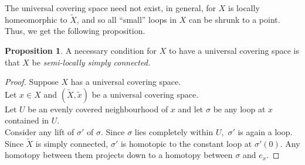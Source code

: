 \documentclass[12pt]{article}
\theoremstyle{definition}
\numberwithin{thm}{section}
\newtheorem{prop}[thm]{Proposition}
\begin{document}
The universal covering space need not exist, in general, for $X$ is locally homeomorphic to $\tilde{X}$, and so all ``small'' loops in $X$ can be shrunk to a point. Thus, we get the following proposition. 
\begin{prop}
	A necessary condition for $X$ to have a universal covering space is that $X$ be \emph{semi-locally simply connected.}
\end{prop}
\begin{proof} 
	Suppose $X$ has a universal covering space.\\
	Let $x \in X$ and $(\tilde{X}, \tilde{x})$ be a universal covering space.\\
	Let $U$ be an evenly covered neighbourhood of $x$ and let $\sigma$ be any loop at $x$ contained in $U.$\\
	Consider any lift of $\sigma'$ of $\sigma.$ Since $\sigma$ lies completely within $U,$ $\sigma'$ is again a loop. Since $\tilde{X}$ is simply connected, $\sigma'$ is homotopic to the constant loop at $\sigma'(0).$ Any homotopy between them projects down to a homotopy between $\sigma$ and $e_x.$
\end{proof}
\end{document}
